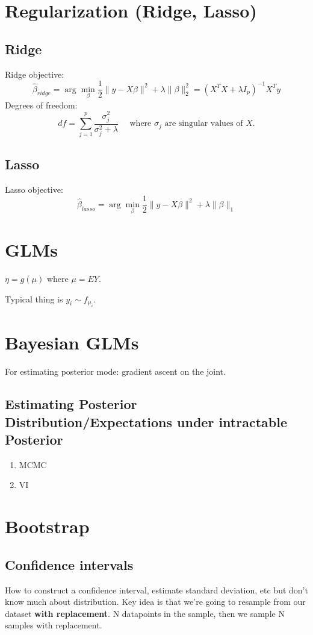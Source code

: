 \documentclass{article}
\begin{document}
\section{Regularization (Ridge, Lasso)}
\subsection{Ridge}
Ridge objective:
$$\hat \beta_{ridge} = \arg \min _\beta \frac{1}{2} \|y - X\beta\|^2 + \lambda \|\beta\|_2^2 = (X^TX + \lambda I_p )^{-1}X^T y $$
Degrees of freedom:
$$df = \sum_{j=1}^p \frac{\sigma^2_j}{\sigma^2_j + \lambda} \quad \text{ where } \sigma_j \text{ are singular values of } X.$$  
\subsection{Lasso}

Lasso objective: 
$$\hat \beta_{lasso} = \arg \min _\beta \frac{1}{2} \|y - X\beta\|^2 + \lambda \|\beta\|_1$$ 

\newpage

\section{GLMs}

$\eta = g(\mu)$ where $\mu = EY$. 


Typical thing is $y_i \sim f_{\mu_i}$. 


\section{Bayesian GLMs}
For estimating posterior mode: gradient ascent on the joint. 

\subsection{Estimating Posterior Distribution/Expectations under intractable Posterior}
\begin{enumerate}
	\item MCMC
	\item VI 
\end{enumerate}
\section{Bootstrap}
\subsection{Confidence intervals}
How to construct a confidence interval, estimate standard deviation, etc but don't know much about distribution. Key idea is that we're going to resample from our dataset \textbf{with replacement}. N datapoints in the sample, then we sample N samples with replacement. 
\end{document}
